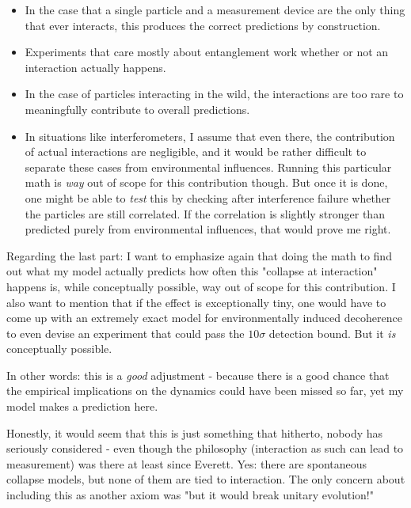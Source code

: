 \documentclass{article}
\begin{document}
\begin{itemize}
\item In the case that a single particle and a measurement device are the only thing that ever interacts, this produces the correct predictions by construction.

\item Experiments that care mostly about entanglement work whether or not an interaction actually happens. 

\item In the case of particles interacting in the wild, the interactions are too rare to meaningfully contribute to overall predictions.

\item In situations like interferometers, I assume that even there, the contribution of actual interactions are negligible, and it would be rather difficult to separate these cases from environmental influences. Running this particular math is \textit{way} out of scope for this contribution though. But once it is done, one might be able to \textit{test} this by checking after interference failure whether the particles are still correlated. If the correlation is slightly stronger than predicted purely from environmental influences, that would prove me right.
\end{itemize}

Regarding the last part: I want to emphasize again that doing the math to find out what my model actually predicts how often this "collapse at interaction" happens is, while conceptually possible, way out of scope for this contribution. I also want to mention that if the effect is exceptionally tiny, one would have to come up with an extremely exact model for environmentally induced decoherence to even devise an experiment that could pass the $10\sigma$ detection bound. But it \textit{is} conceptually possible.

In other words: this is a \textit{good} adjustment - because there is a good chance that the empirical implications on the dynamics could have been missed so far, yet my model makes a prediction here.

Honestly, it would seem that this is just something that hitherto, nobody has seriously considered - even though the philosophy (interaction as such can lead to measurement) was there at least since Everett. Yes: there are spontaneous collapse models, but none of them are tied to interaction. The only concern about including this as another axiom was "but it would break unitary evolution!"
\end{document}
